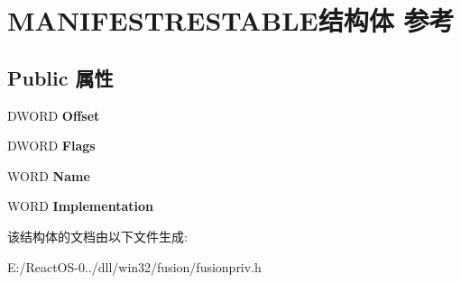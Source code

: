 \hypertarget{struct_m_a_n_i_f_e_s_t_r_e_s_t_a_b_l_e}{}\section{M\+A\+N\+I\+F\+E\+S\+T\+R\+E\+S\+T\+A\+B\+L\+E结构体 参考}
\label{struct_m_a_n_i_f_e_s_t_r_e_s_t_a_b_l_e}
\subsection*{Public 属性}
\begin{DoxyCompactItemize}
\item 
\mbox{\label{struct_m_a_n_i_f_e_s_t_r_e_s_t_a_b_l_e_ab801d8e7e638122b72d83e82e564b922}} 
D\+W\+O\+RD {\bfseries Offset}
\item 
\mbox{\label{struct_m_a_n_i_f_e_s_t_r_e_s_t_a_b_l_e_a2e78e76bba5e1094676e93b1b5e5628e}} 
D\+W\+O\+RD {\bfseries Flags}
\item 
\mbox{\label{struct_m_a_n_i_f_e_s_t_r_e_s_t_a_b_l_e_a5085427ef108de71dda4775ff4853ad5}} 
W\+O\+RD {\bfseries Name}
\item 
\mbox{\label{struct_m_a_n_i_f_e_s_t_r_e_s_t_a_b_l_e_ab1b99a998545485a71241c37141ee0ab}} 
W\+O\+RD {\bfseries Implementation}
\end{DoxyCompactItemize}


该结构体的文档由以下文件生成\+:\begin{DoxyCompactItemize}
\item 
E\+:/\+React\+O\+S-\/0../dll/win32/fusion/fusionpriv.\+h\end{DoxyCompactItemize}
